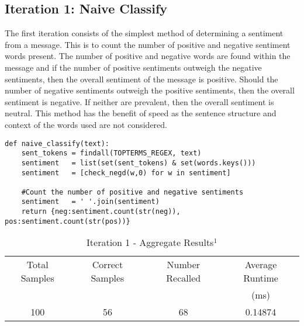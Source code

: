 \newpage
\subsection{Iteration 1: Naive Classify} %
\label{sub:iteration_1_naive_classify}
The first iteration consists of the simplest method of determining a sentiment from a message.  This is to count the number of positive and negative sentiment words present. The number of positive and negative words are found within the message and if the number of positive sentiments outweigh the negative sentiments, then the overall sentiment of the message is positive. Should the number of negative sentiments outweigh the positive sentiments, then the overall sentiment is negative. If neither are prevalent, then the overall sentiment is neutral.  This method has the benefit of speed as the sentence structure and context of the words used are not considered.\\

	\begin{lstlisting}[caption={\textit{utils.py}: code fragment for naive classify}]
def naive_classify(text):
    sent_tokens = findall(TOPTERMS_REGEX, text)
    sentiment   = list(set(sent_tokens) & set(words.keys()))
    sentiment   = [check_negd(w,0) for w in sentiment]

    #Count the number of positive and negative sentiments
    sentiment   = ' '.join(sentiment)
    return {neg:sentiment.count(str(neg)), pos:sentiment.count(str(pos))}
	\end{lstlisting}
	
	\begin{table}[htp]
		\centering
		\caption{Iteration 1 - Aggregate Results$^1$}
		\begin{tabular}{cccc}
			\toprule
Total Samples	& Correct Samples	& Number Recalled   & Average Runtime\\
				&					&                   & (ms)\\
			\toprule
100             & 56                & 68                & 0.14874 \\
			\bottomrule
		\end{tabular}
		\label{tab:iter_1_aggregate_results}
	\end{table}

\newpage
